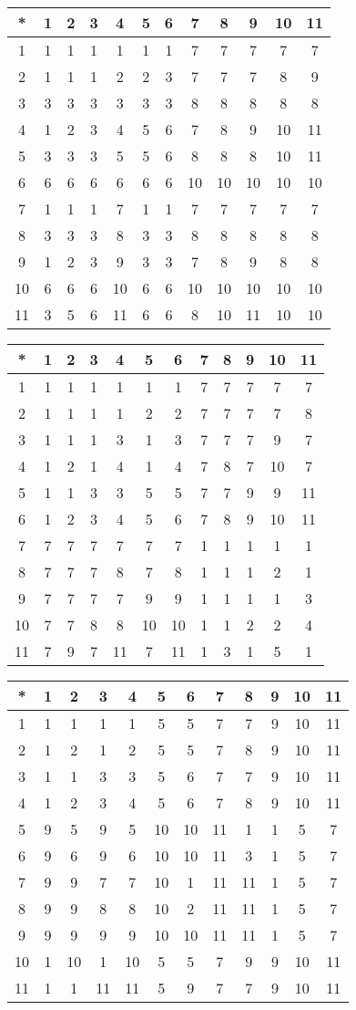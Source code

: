\begin{tabular}[t]{c|ccccccccccc}
*&1&2&3&4&5&6&7&8&9&10&11 \\ \hline
    1&1&1&1&1&1&1&7&7&7&7&7 \\
    2&1&1&1&2&2&3&7&7&7&8&9 \\
    3&3&3&3&3&3&3&8&8&8&8&8 \\
    4&1&2&3&4&5&6&7&8&9&10&11 \\
    5&3&3&3&5&5&6&8&8&8&10&11 \\
    6&6&6&6&6&6&6&10&10&10&10&10 \\
    7&1&1&1&7&1&1&7&7&7&7&7 \\
    8&3&3&3&8&3&3&8&8&8&8&8 \\
    9&1&2&3&9&3&3&7&8&9&8&8 \\
    10&6&6&6&10&6&6&10&10&10&10&10 \\
    11&3&5&6&11&6&6&8&10&11&10&10 
\end{tabular}


\begin{tabular}[t]{c|ccccccccccc}
*&1&2&3&4&5&6&7&8&9&10&11 \\ \hline
    1&1&1&1&1&1&1&7&7&7&7&7 \\
    2&1&1&1&1&2&2&7&7&7&7&8 \\
    3&1&1&1&3&1&3&7&7&7&9&7 \\
    4&1&2&1&4&1&4&7&8&7&10&7 \\
    5&1&1&3&3&5&5&7&7&9&9&11 \\
    6&1&2&3&4&5&6&7&8&9&10&11 \\
    7&7&7&7&7&7&7&1&1&1&1&1 \\
    8&7&7&7&8&7&8&1&1&1&2&1 \\
    9&7&7&7&7&9&9&1&1&1&1&3 \\
    10&7&7&8&8&10&10&1&1&2&2&4 \\
    11&7&9&7&11&7&11&1&3&1&5&1 
\end{tabular}


\begin{tabular}[t]{c|ccccccccccc}
*&1&2&3&4&5&6&7&8&9&10&11 \\ \hline
    1&1&1&1&1&5&5&7&7&9&10&11 \\
    2&1&2&1&2&5&5&7&8&9&10&11 \\
    3&1&1&3&3&5&6&7&7&9&10&11 \\
    4&1&2&3&4&5&6&7&8&9&10&11 \\
    5&9&5&9&5&10&10&11&1&1&5&7 \\
    6&9&6&9&6&10&10&11&3&1&5&7 \\
    7&9&9&7&7&10&1&11&11&1&5&7 \\
    8&9&9&8&8&10&2&11&11&1&5&7 \\
    9&9&9&9&9&10&10&11&11&1&5&7 \\
    10&1&10&1&10&5&5&7&9&9&10&11 \\
    11&1&1&11&11&5&9&7&7&9&10&11 
\end{tabular}


